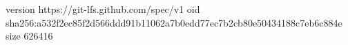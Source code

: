 version https://git-lfs.github.com/spec/v1
oid sha256:a532f2ec85f2d566ddd91b11062a7b0edd77ec7b2cb80e50434188c7eb6c884e
size 626416
